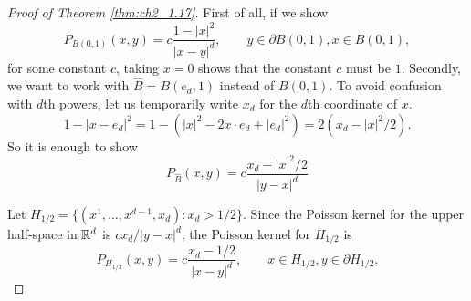 \begin{proof}[Proof of Theorem \ref{thm:ch2_1.17}]
First of all, if we show
\[
    P_{B(0,1)}(x,y) = c\frac{1-|x|^2}{|x-y|^d}, \qquad y \in \partial B(0,1), x \in B(0,1),
\]
for some constant $c$, taking $x = 0$ shows that the constant $c$ must be $1$. Secondly, we want to work with $\widehat{B} = B(e_d,1)$ instead of $B(0,1)$. To avoid confusion with $d$th powers, let us temporarily write $x_d$ for the $d$th coordinate of $x$.
\[
    1 - |x - e_d|^2 = 1 - (|x|^2 - 2x \cdot e_d + |e_d|^2) = 2(x_d - |x|^2/2).
\]
So it is enough to show
\begin{equation}\label{eq:ch2_1.19}
    P_{\widehat{B}}(x,y) = c\frac{x_d - |x|^2/2}{|y-x|^d}
\end{equation}

Let $H_{1/2} = \{(x^1,\ldots,x^{d-1},x_d) : x_d > 1/2\}$. Since the Poisson kernel for the upper half-space in $\mathbb{R}^d$ is $cx_d/|y-x|^d$, the Poisson kernel for $H_{1/2}$ is
\begin{equation}\label{eq:ch2_1.20}
    P_{H_{1/2}}(x,y) = c\frac{x_d - 1/2}{|x-y|^d}, \qquad x \in H_{1/2}, y \in \partial H_{1/2}.
\end{equation}


\end{proof}
